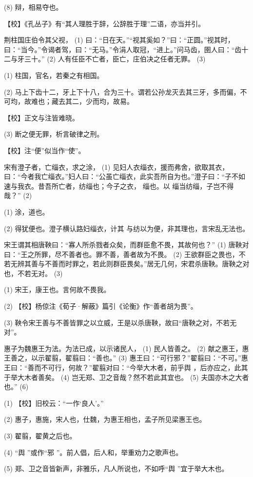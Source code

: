 \documentclass[12pt,UTF8]{ctexbook}
\begin{document}
(8) 辩，相易夺也。

【校】《孔丛子》有“其人理胜于辞，公辞胜于理”二语，亦当并引。

荆柱国庄伯令其父视， (1) 曰：“日在天。”“视其奚如？”曰：“正圆。”视其时，曰：“当今。”令谒者驾，曰：“无马。”令涓人取冠，“进上。”问马齿，圉人曰：“齿十二与牙三十。” (2) 人有任臣不亡者，臣亡，庄伯决之任者无罪。 (3)

(1) 柱国，官名，若秦之有相国。

(2) 马上下齿十二，牙上下十八，合为三十。谓若公孙龙灭去其三牙，多而偏，不可均，故难也；藏去其二，少而均，故易。

【校】正文与注皆难晓。

(3) 断之便无罪，析言破律之刑。

【校】注“便”似当作“使”。

宋有澄子者，亡缁衣，求之涂， (1) 见妇人衣缁衣，援而弗舍，欲取其衣，曰：“今者我亡缁衣。”妇人曰：“公虽亡缁衣，此实吾所自为也。”澄子曰：“子不如速与我衣。昔吾所亡者，纺缁也；今子之衣， 缁也。以 缁当纺缁，子岂不得哉？” (2)

(1) 涂，道也。

(2) 得犹便也。澄子横认路妇缁衣，计其 与纺以为便，非其理也，言宋乱无法也。

宋王谓其相唐鞅曰：“寡人所杀戮者众矣，而群臣愈不畏，其故何也？” (1) 唐鞅对曰：“王之所罪，尽不善者也。罪不善，善者故为不畏。 (2) 王欲群臣之畏也，不若无辨其善与不善而时罪之，若此则群臣畏矣。”居无几何，宋君杀唐鞅。唐鞅之对也，不若无对。 (3)

(1) 宋王，康王也。言何故不畏我。

(2) 【校】杨倞注《荀子·解蔽》篇引《论衡》作“善者胡为畏”。

(3) 鞅令宋王善与不善皆罪之以立威，王是以杀唐鞅，故曰“唐鞅之对，不若无对”。

惠子为魏惠王为法。为法已成，以示诸民人， (1) 民人皆善之。 (2) 献之惠王，惠王善之，以示翟翦，翟翦曰：“善也。” (3) 惠王曰：“可行邪？”翟翦曰：“不可。”惠王曰：“善而不可行，何故？”翟翦对曰：“今举大木者，前乎舆 ，后亦应之，此其于举大木者善矣。 (4) 岂无郑、卫之音哉？然不若此其宜也。 (5) 夫国亦木之大者也。” (6)

(1) 【校】旧校云：“一作‘良人’。”

(2) 惠子，惠施，宋人也，仕魏，为惠王相也，孟子所见梁惠王也。

(3) 翟翦，翟黄之后也。

(4) “舆 ”或作“邪 ”。前人倡，后人和，举重劝力之歌声也。

(5) 郑、卫之音皆新声，非雅乐，凡人所说也，不如呼“舆 ”宜于举大木也。
\end{document}
